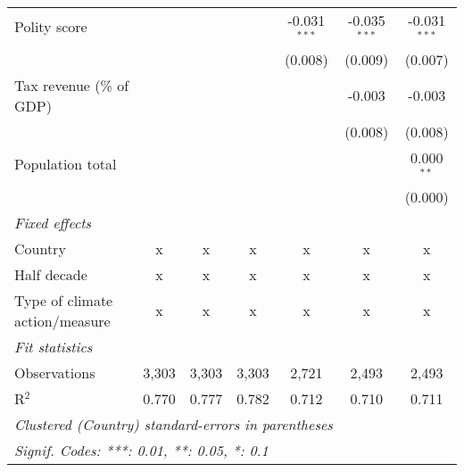 \begin{tabular}{lcccccc}
   Polity score                                                  &         &               &               & -0.031$^{***}$ & -0.035$^{***}$ & -0.031$^{***}$\\   
                                                                 &         &               &               & (0.008)        & (0.009)        & (0.007)\\   
   Tax revenue (\% of GDP)                                       &         &               &               &                & -0.003         & -0.003\\   
                                                                 &         &               &               &                & (0.008)        & (0.008)\\   
   Population total                                              &         &               &               &                &                & 0.000$^{**}$\\   
                                                                 &         &               &               &                &                & (0.000)\\   
   \emph{Fixed effects}\\
   Country                                                       & x       & x             & x             & x              & x              & x\\  
   Half decade                                                   & x       & x             & x             & x              & x              & x\\  
   Type of climate action/measure                                & x       & x             & x             & x              & x              & x\\  
   \midrule \emph{Fit statistics}\\
   Observations                                                  & 3,303   & 3,303         & 3,303         & 2,721          & 2,493          & 2,493\\  
   R$^2$                                                         & 0.770   & 0.777         & 0.782         & 0.712          & 0.710          & 0.711\\  
   \midrule
   \multicolumn{7}{l}{\emph{Clustered (Country) standard-errors in parentheses}}\\
   \multicolumn{7}{l}{\emph{Signif. Codes: ***: 0.01, **: 0.05, *: 0.1}}\\
\end{tabular}
\par\endgroup


